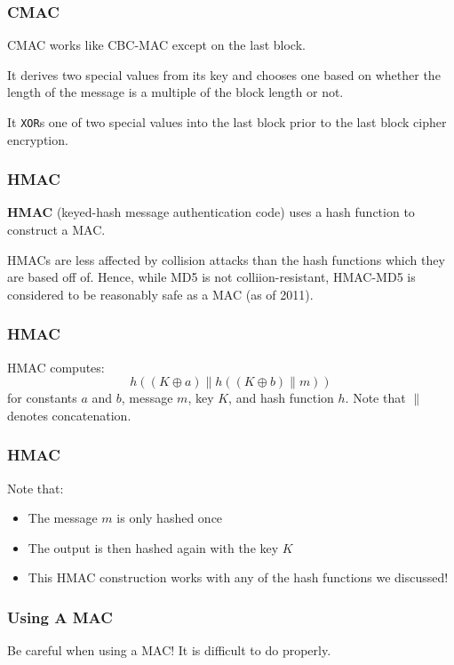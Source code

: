 \documentclass{beamer}
\newcommand{\<}{\langle}
\renewcommand{\>}{\rangle}
\begin{document}
\begin{frame}[fragile]
\frametitle{CMAC}

CMAC works like CBC-MAC except on the last block. \newline

It derives two special values from its key and chooses one based on whether the length of the message is a multiple of the block length or not.\newline

It \verb|XOR|s one of two special values into the last block prior to the last block cipher encryption. 
\end{frame}



\begin{frame}
\frametitle{HMAC}

\textbf{HMAC} (keyed-hash message authentication code) uses a hash function to construct a MAC.\newline

HMACs are less affected by collision attacks than the hash functions which they are based off of. Hence, while MD5 is not colliion-resistant, HMAC-MD5 is considered to be reasonably safe as a MAC (as of 2011).
\end{frame}



\begin{frame}
\frametitle{HMAC}

HMAC computes:
\[
h((K\oplus a) \| h((K\oplus b)\|m))
\]
for constants $a$ and $b$, message $m$, key $K$, and hash function $h$. Note that $\|$ denotes concatenation.
\end{frame}

\begin{frame}
\frametitle{HMAC}

Note that:
\begin{itemize}
\item The message $m$ is only hashed once
\item The output is then hashed again with the key $K$
\item This HMAC construction works with any of the hash functions we discussed!
\end{itemize}
\end{frame}


\begin{frame}
\frametitle{Using A MAC}

Be careful when using a MAC! It is difficult to do properly.
\end{frame}
\end{document}
